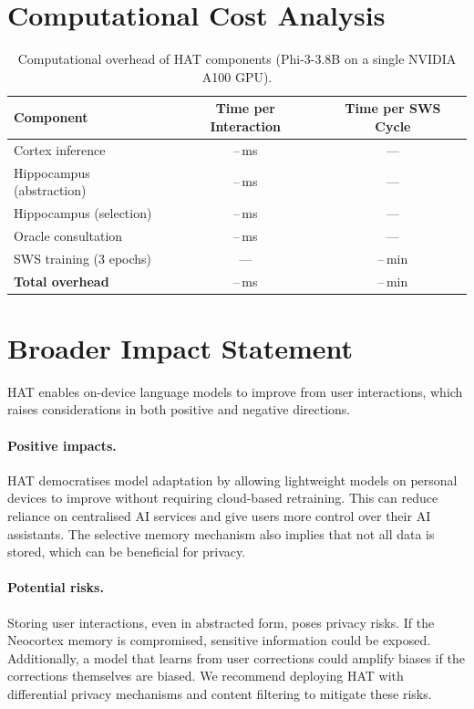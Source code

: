 
\section{Computational Cost Analysis}
\label{app:compute}

\begin{table}[h]
  \centering
  \caption{Computational overhead of HAT components (Phi-3-3.8B on a single NVIDIA A100 GPU).}
  \label{tab:compute}
  \small
  \begin{tabular}{@{}lcc@{}}
    \toprule
    \textbf{Component} & \textbf{Time per Interaction} & \textbf{Time per SWS Cycle} \\
    \midrule
    Cortex inference             & --\,ms  & --- \\
    Hippocampus (abstraction)    & --\,ms  & --- \\
    Hippocampus (selection)      & --\,ms  & --- \\
    Oracle consultation          & --\,ms  & --- \\
    SWS training (3 epochs)      & ---     & --\,min \\
    \midrule
    \textbf{Total overhead}      & --\,ms  & --\,min \\
    \bottomrule
  \end{tabular}
\end{table}


\section{Broader Impact Statement}
\label{app:broader_impact}

HAT enables on-device language models to improve from user interactions, which raises considerations in both positive and negative directions.

\paragraph{Positive impacts.}
HAT democratises model adaptation by allowing lightweight models on personal devices to improve without requiring cloud-based retraining.
This can reduce reliance on centralised AI services and give users more control over their AI assistants.
The selective memory mechanism also implies that not all data is stored, which can be beneficial for privacy.

\paragraph{Potential risks.}
Storing user interactions, even in abstracted form, poses privacy risks.
If the Neocortex memory is compromised, sensitive information could be exposed.
Additionally, a model that learns from user corrections could amplify biases if the corrections themselves are biased.
We recommend deploying HAT with differential privacy mechanisms and content filtering to mitigate these risks.
